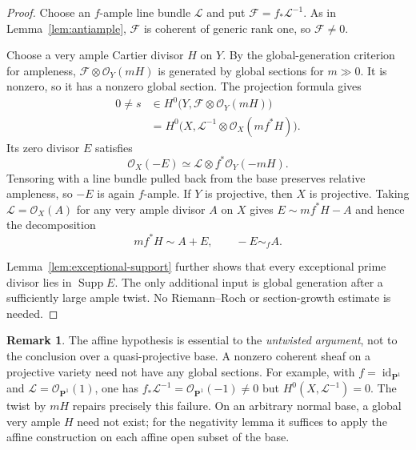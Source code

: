 \documentclass[12pt,a4paper,psamsfonts]{amsart}
\theoremstyle{plain}
\theoremstyle{definition}
\newtheorem{remark}[theorem]{Remark}
\newcommand{\OO}{\mathcal O}
\DeclareMathOperator{\Supp}{Supp}
\begin{document}
\begin{proof}
Choose an $f$-ample line bundle $\mathcal L$ and put
$\mathcal F=f_*\mathcal L^{-1}$. As in
Lemma~\ref{lem:antiample}, $\mathcal F$ is coherent of generic rank
one, so $\mathcal F\neq0$.

Choose a very ample Cartier divisor $H$
on $Y$. By the global-generation criterion for ampleness,
$\mathcal F\otimes\OO_Y(mH)$ is generated by global sections for
$m\gg0$. It is nonzero, so it has a nonzero global section.
The projection formula gives
\[
\begin{split}
0\neq s&\in H^0\bigl(Y,\mathcal F\otimes\OO_Y(mH)\bigr)\\
&=H^0\bigl(X,\mathcal L^{-1}\otimes\OO_X(mf^*H)\bigr).
\end{split}
\]
Its zero divisor $E$ satisfies
\[
\OO_X(-E)\simeq\mathcal L\otimes f^*\OO_Y(-mH).
\]
Tensoring with a line bundle pulled back from the base preserves
relative ampleness, so $-E$ is again $f$-ample. If $Y$ is projective,
then $X$ is projective. Taking $\mathcal L=\OO_X(A)$ for
any very ample divisor $A$ on $X$ gives $E\sim mf^*H-A$ and hence
the decomposition
\[
mf^*H\sim A+E,\qquad -E\sim_f A.
\]


Lemma~\ref{lem:exceptional-support} further shows
that every exceptional prime divisor lies in $\Supp E$.
The only additional input is global generation after a sufficiently
large ample twist. No Riemann--Roch or section-growth estimate is
needed.
\end{proof}

\begin{remark}
The affine hypothesis is essential to the \emph{untwisted argument},
not to the conclusion over a quasi-projective base. A nonzero
coherent sheaf on a projective variety need not have any global
sections. For example, with $f=\operatorname{id}_{\mathbf P^1}$ and
$\mathcal L=\OO_{\mathbf P^1}(1)$, one has
$f_*\mathcal L^{-1}=\OO_{\mathbf P^1}(-1)\neq0$ but
$H^0(X,\mathcal L^{-1})=0$. The twist by $mH$ repairs precisely
this failure. On an arbitrary normal base, a global very ample
$H$ need not exist; for the negativity lemma it suffices to apply
the affine construction on each affine open subset of the base.
\end{remark}
\end{document}
